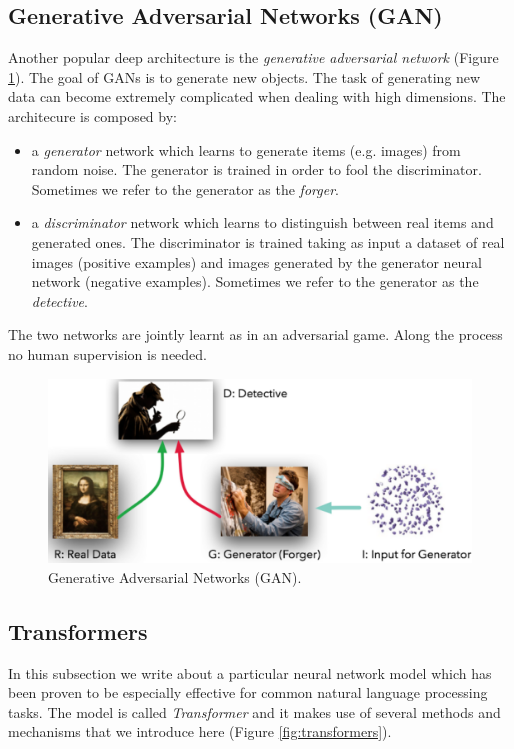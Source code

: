 \subsection{Generative Adversarial Networks (GAN)}
Another popular deep architecture is the \textit{generative adversarial network}
(Figure \ref{fig:generative_adversarial_network}). The goal of GANs is to generate
new objects. The task of generating new data can become extremely complicated
when dealing with high dimensions. The architecure is composed by:
\begin{itemize}
	\item a \textit{generator} network which learns to generate items (e.g. images)
		from random noise. The generator is trained in order to fool the
		discriminator. Sometimes we refer to the generator as the \textit{forger}.

	\item a \textit{discriminator} network which learns to distinguish between
		real items and generated ones. The discriminator is trained taking as input a
		dataset of real images (positive examples) and images generated by the generator
		neural network (negative examples). Sometimes we refer to the generator as
		the \textit{detective}.
\end{itemize}
The two networks are jointly learnt as in an adversarial game. Along the process
no human supervision is needed.

\begin{figure}[H]
	\centering
	\includegraphics[width=\textwidth]{
		images/16_DeepLearning_generativeAdversarialNetwork.png
	}
	\caption{Generative Adversarial Networks (GAN).}
	\label{fig:generative_adversarial_network}
\end{figure}

\subsection{Transformers}
In this subsection we write about a particular neural network model which has
been proven to be especially effective for common natural language processing
tasks. The model is called \textit{Transformer} and it makes use of several
methods and mechanisms that we introduce here (Figure \ref{fig:transformers}).

